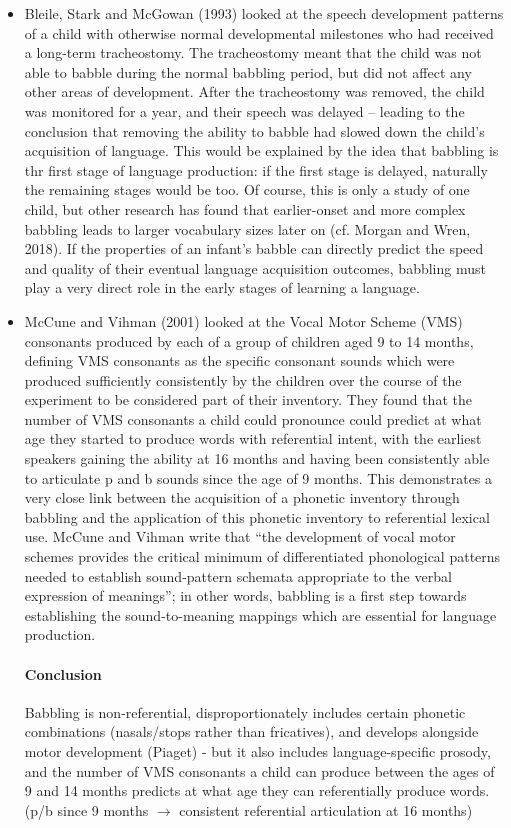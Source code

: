 \documentclass{article}
\begin{document}
\begin{itemize}
    \item Bleile, Stark and McGowan (1993) looked at the speech development patterns of a child with otherwise normal developmental milestones who had received a long-term tracheostomy. The tracheostomy meant that the child was not able to babble during the normal babbling period, but did not affect any other areas of development. After the tracheostomy was removed, the child was monitored for a year, and their speech was delayed – leading to the conclusion that removing the ability to babble had slowed down the child’s acquisition of language. This would be explained by the idea that babbling is thr first stage of language production: if the first stage is delayed, naturally the remaining stages would be too. Of course, this is only a study of one child, but other research has found that earlier-onset and more complex babbling leads to larger vocabulary sizes later on (cf. Morgan and Wren, 2018). If the properties of an infant’s babble can directly predict the speed and quality of their eventual language acquisition outcomes, babbling must play a very direct role in the early stages of learning a language. 
    \item McCune and Vihman (2001) looked at the Vocal Motor Scheme (VMS) consonants produced by each of a group of children aged 9 to 14 months, defining VMS consonants as the specific consonant sounds which were produced sufficiently consistently by the children over the course of the experiment to be considered part of their inventory. They found that the number of VMS consonants a child could pronounce could predict at what age they started to produce words with referential intent, with the earliest speakers gaining the ability at 16 months and having been consistently able to articulate p and b sounds since the age of 9 months. This demonstrates a very close link between the acquisition of a phonetic inventory through babbling and the application of this phonetic inventory to referential lexical use. McCune and Vihman write that “the development of vocal motor schemes provides the critical minimum of differentiated phonological patterns needed to establish sound-pattern schemata appropriate to the verbal expression of meanings”; in other words, babbling is a first step towards establishing the sound-to-meaning mappings which are essential for language production.
    \paragraph{Conclusion} Babbling is non-referential, disproportionately includes certain phonetic combinations (nasals/stops rather than fricatives), and develops alongside motor development (Piaget) - but it also includes language-specific prosody, and the number of VMS consonants a child can produce between the ages of 9 and 14 months predicts at what age they can referentially produce words. (p/b since 9 months $\rightarrow$ consistent referential articulation at 16 months)
\end{itemize}
\end{document}
